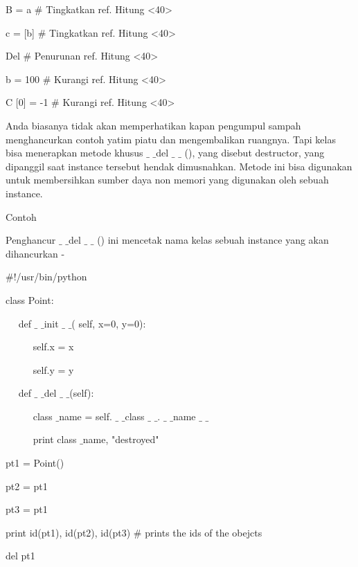 B = a  $  \#  $ Tingkatkan ref. Hitung <40> \par
\noindent 
c = [b]  $  \#  $ Tingkatkan ref. Hitung <40> \par
\vspace{12pt}
\noindent 
Del  $  \#  $ Penurunan ref. Hitung <40> \par
\noindent 
b = 100  $  \#  $ Kurangi ref. Hitung <40> \par
\noindent 
C [0] = -1  $  \#  $ Kurangi ref. Hitung <40> \par
\vspace{12pt}
Anda biasanya tidak akan memperhatikan kapan pengumpul sampah menghancurkan contoh yatim piatu dan mengembalikan ruangnya. Tapi kelas bisa menerapkan metode khusus  $  \_  $ $  \_  $del  $  \_  $ $  \_  $ (), yang disebut destructor, yang dipanggil saat instance tersebut hendak dimusnahkan. Metode ini bisa digunakan untuk membersihkan sumber daya non memori yang digunakan oleh sebuah instance. \par
\noindent 
Contoh \par
\vspace{12pt}
\noindent 
Penghancur  $  \_  $ $  \_  $del  $  \_  $ $  \_  $ () ini mencetak nama kelas sebuah instance yang akan dihancurkan - \par
\noindent 
 $  \#  $!/usr/bin/python \par
\vspace{12pt}
\noindent 
class Point: \par
\noindent 
~~ def  $  \_  $ $  \_  $init $  \_  $ $  \_  $( self, x=0, y=0): \par
\noindent 
~~~~~ self.x = x \par
\noindent 
~~~~~ self.y = y \par
\noindent 
~~ def  $  \_  $ $  \_  $del $  \_  $ $  \_  $(self): \par
\noindent 
~~~~~ class $  \_  $name = self. $  \_  $ $  \_  $class $  \_  $ $  \_  $. $  \_  $ $  \_  $name $  \_  $ $  \_  $ \par
\noindent 
~~~~~ print class $  \_  $name, "destroyed" \par
\vspace{12pt}
\noindent 
pt1 = Point() \par
\noindent 
pt2 = pt1 \par
\noindent 
pt3 = pt1 \par
\noindent 
print id(pt1), id(pt2), id(pt3)  $  \#  $ prints the ids of the obejcts \par
\noindent 
del pt1 \par
